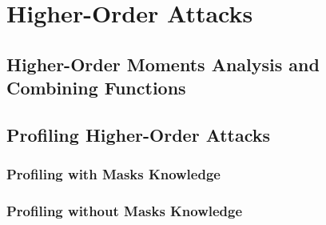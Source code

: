 \section{Higher-Order Attacks}
\subsection{Higher-Order Moments Analysis and Combining Functions}
\subsection{Profiling Higher-Order Attacks}
\subsubsection{Profiling with Masks Knowledge}
\subsubsection{Profiling without Masks Knowledge}

